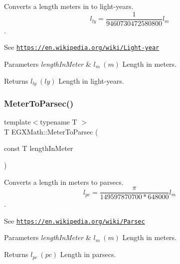 Converts a length meters in to light-\/years. \[ l_{ly}= \frac{1}{9460730472580800} l_{m} \]. 

See \href{https://en.wikipedia.org/wiki/Light-year}{\tt https\+://en.\+wikipedia.\+org/wiki/\+Light-\/year} 
\begin{DoxyParams}{Parameters}
{\em length\+In\+Meter} & $ l_{m}\ (m)$ Length in meters. \\
\hline
\end{DoxyParams}
\begin{DoxyReturn}{Returns}
$ l_{ly}\ (ly)$ Length in light-\/years. 
\end{DoxyReturn}
\mbox{\label{group___e_g_x_math-_conversions-_length_conversions-_s_i-_meter-_astronomical_ga326ca8b69fece7b50052e3f319d5ce5a}} 
\subsubsection{\texorpdfstring{Meter\+To\+Parsec()}{MeterToParsec()}}
{\footnotesize\ttfamily template$<$typename T $>$ \\
T E\+G\+X\+Math\+::\+Meter\+To\+Parsec (\begin{DoxyParamCaption}\item[{const T}]{length\+In\+Meter }\end{DoxyParamCaption})}



Converts a length in meters to parsecs. \[ l_{pc}=\frac{\pi}{149597870700 * 648000} l_{m} \]. 

See \href{https://en.wikipedia.org/wiki/Parsec}{\tt https\+://en.\+wikipedia.\+org/wiki/\+Parsec} 
\begin{DoxyParams}{Parameters}
{\em length\+In\+Meter} & $ l_{m}\ (m)$ Length in meters. \\
\hline
\end{DoxyParams}
\begin{DoxyReturn}{Returns}
$ l_{pc}\ (pc)$ Length in parsecs. 
\end{DoxyReturn}
